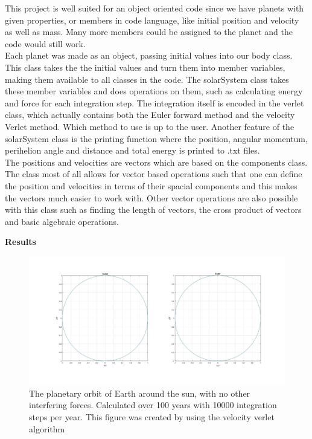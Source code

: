\documentclass[10pt,a4paper]{article}
\begin{document}
   

\noindent This project is well suited for an object oriented code since we have planets with given properties, or members in code language, like initial position and velocity as well as mass. Many more members could be assigned to the planet and the code would still work.\\ 

\noindent Each planet was made as an object, passing initial values into our body class. This class takes the the initial values and turn them into member variables, making them available to all classes in the code. The solarSystem class takes these member variables and does operations on them, such as calculating energy and force for each integration step. The integration itself is encoded in the verlet class, which actually contains both the Euler forward method and the velocity Verlet method. Which method to use is up to the user. Another feature of the solarSystem class is the printing function where the position, angular momentum, perihelion angle and distance and total energy is printed to .txt files.\\

\noindent The positions and velocities are vectors which are based on the components class. The class most of all allows for vector based operations such that one can define the position and velocities in terms of their spacial components and this makes the vectors much easier to work with. Other vector operations are also possible with this class such as finding the length of vectors, the cross product of vectors and basic algebraic operations.













\newpage
{\LARGE\bf
Results
}\\
\begin{figure} [H]  

\centerline{\includegraphics[scale=0.3]{FirstModel.jpg}}
\caption{The planetary orbit of Earth around the sun, with no other interfering forces. Calculated over 100 years with 10000 integration steps per year. This figure was created by using the velocity verlet algorithm}
\end{figure}
\end{document}
